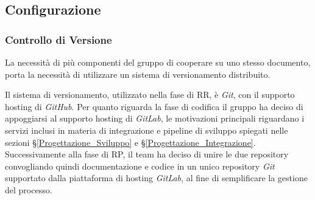 

\subsection{Configurazione}
\subsubsection{Controllo di Versione}\label{ProcessiSupporto_Versionamento}
La necessità di più componenti del gruppo di cooperare su uno stesso documento, porta la necessità di utilizzare un sistema di versionamento distribuito.



Il sistema di versionamento, utilizzato nella fase di RR, è \textit{Git}, con il supporto hosting di \textit{GitHub}. Per quanto riguarda la fase di codifica il gruppo ha deciso di appoggiarsi al supporto hosting di \textit{GitLab}, le motivazioni principali riguardano i servizi inclusi in materia di integrazione e pipeline di sviluppo spiegati nelle sezioni §\ref{Progettazione_Sviluppo} e §\ref{Progettazione_Integrazione}.\\
Successivamente alla fase di RP, il team ha deciso di unire le due repository convogliando quindi documentazione e codice in un unico repository \textit{Git} supportato dalla piattaforma di hosting \textit{GitLab}, al fine di semplificare la gestione del processo.

